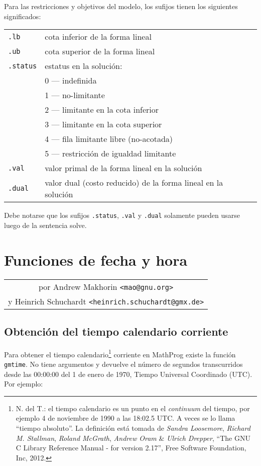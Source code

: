 \documentclass[11pt,spanish]{report}
\begin{document}
Para las restricciones y objetivos del modelo, los sufijos tienen los siguientes significados:

\begin{tabular}{@{}ll@{}}
{\tt.lb}&cota inferior de la forma lineal\\
{\tt.ub}&cota superior de la forma lineal\\
{\tt.status}&estatus en la solución:\\
&0 --- indefinida\\
&1 --- no-limitante\\
&2 --- limitante en la cota inferior\\
&3 --- limitante en la cota superior\\
&4 --- fila limitante libre (no-acotada)\\
&5 --- restricción de igualdad limitante\\
{\tt.val}&valor primal de la forma lineal en la solución\\
{\tt.dual}&valor dual (costo reducido) de la forma lineal en la solución\\
\end{tabular}

Debe notarse que los sufijos {\tt.status}, {\tt.val} y {\tt.dual} solamente pueden usarse luego de la sentencia solve.


\chapter{Funciones de fecha y hora}

\noindent\hfil
\begin{tabular}{c}
por Andrew Makhorin \verb|<mao@gnu.org>|\\
y Heinrich Schuchardt \verb|<heinrich.schuchardt@gmx.de>|\\
\end{tabular}

\section{Obtención del tiempo calendario corriente}
\label{gmtime}

Para obtener el tiempo calendario\footnote{N. del T.: el tiempo calendario es un punto en el {\it continuum} del tiempo, por ejemplo 4 de noviembre de 1990 a las 18:02.5 UTC. A veces se lo llama ``tiempo absoluto''. La definición está tomada de {\it Sandra Loosemore}, {\it Richard M. Stallman}, {\it Roland McGrath}, {\it Andrew Oram} \& {\it Ulrich Drepper}, ``The GNU C Library Reference Manual - for version 2.17'', Free Software Foundation, Inc, 2012.} corriente en MathProg existe la función {\tt gmtime}. No tiene argumentos y devuelve el número de segundos transcurridos desde las 00:00:00 del 1 de enero de 1970, Tiempo Universal Coordinado (UTC). Por ejemplo:
\end{document}
